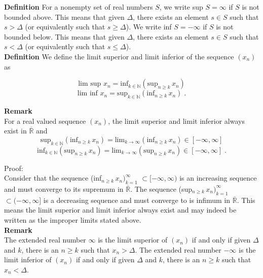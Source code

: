 \documentclass[a4paper]{article}
\begin{document}
{\bf Definition} For a nonempty set of real numbers $S$, we write sup $S = \infty$ if $S$ is not bounded above. This means that given $\Delta$, there exists an element $s \in S$ such that $s > \Delta$ (or equivalently such that $s \geq \Delta$). We write inf $S = -\infty$ if $S$ is not bounded below. This means that given $\Delta$, there exists an element $s \in S$ such that $s < \Delta$ (or equivalently such that $s \leq \Delta$).\\

{\bf Definition} We define the limit superior and limit inferior of the sequence $(x_n)$ as

$$\text{lim sup } x_n = \text{inf}_{k\in \mathbb{N}} (\text{sup}_{n \geq k} \, x_n)$$
$$\text{lim inf } x_n =\text{sup}_{k \in \mathbb{N}} (\text{inf}_{n\geq k} \, x_n) \;.$$

{\bf Remark}\\
For a real valued sequence $(x_n)$, the limit superior and limit inferior always exist in $\overline{\mathbb{R}}$ and 
$$\text{sup}_{k \in \mathbb{N}} (\text{inf}_{n\geq k} \, x_n) = \text{lim}_{k\rightarrow \infty} (\text{inf}_{n\geq k} \, x_n) \in [-\infty, \infty]$$
$$\text{inf}_{k \in \mathbb{N}} (\text{sup}_{n\geq k} \, x_n) = \text{lim}_{k\rightarrow \infty} (\text{sup}_{n\geq k} \, x_n) \in [-\infty, \infty] \;.$$

Proof:\\

Consider that the sequence (inf$_{n\geq k}\, x_n)_{k=1}^{\infty}$ $\subset [-\infty, \infty)$ is an increasing sequence and must converge to its supremum in $\overline{\mathbb{R}}$. The sequence (sup$_{n\geq k}\, x_n)_{k=1}^{\infty}$ $\subset (-\infty, \infty]$ is a decreasing sequence and must converge to is infimum in $\overline{\mathbb{R}}$. This means the limit superior and limit inferior always exist and may indeed be written as the improper limits stated above.\\

{\bf Remark}\\
The extended real number $\infty$ is the limit superior of $(x_n)$ if and only if given $\Delta$ and $k$, there is an $n\geq k$ such that $x_n > \Delta$. The extended real number $-\infty$ is the limit inferior of $(x_n)$ if and only if given $\Delta$ and $k$, there is an $n\geq k$ such that $x_n < \Delta$.\\
\end{document}

